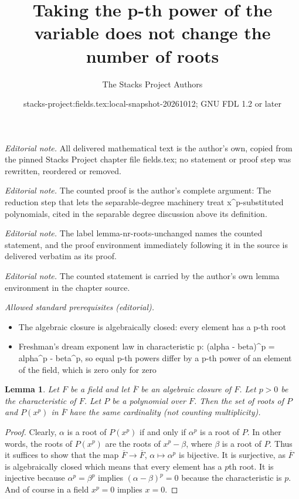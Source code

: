 \documentclass[10pt,a4paper]{amsart}
\title{Taking the p-th power of the variable does not change the number of roots}
\author{The Stacks Project Authors}
\date{stacks-project:fields.tex:local-snapshot-20261012; GNU FDL 1.2 or later}
\theoremstyle{plain}
\newtheorem{lemma}[subsection]{Lemma}
\theoremstyle{definition}
\theoremstyle{remark}
\numberwithin{equation}{subsection}
\begin{document}
\maketitle
\noindent\textit{Editorial note.} All delivered mathematical text is the author's own, copied from the pinned Stacks Project chapter file fields.tex; no statement or proof step was rewritten, reordered or removed.\par\medskip
\noindent\textit{Editorial note.} The counted proof is the author's complete argument: The reduction step that lets the separable-degree machinery treat x\textasciicircum{}p-substituted polynomials, cited in the separable degree discussion above its definition.\par\medskip
\noindent\textit{Editorial note.} The label lemma-nr-roots-unchanged names the counted statement, and the proof environment immediately following it in the source is delivered verbatim as its proof.\par\medskip
\noindent\textit{Editorial note.} The counted statement is carried by the author's own lemma environment in the chapter source.\par\medskip
\noindent\textit{Allowed standard prerequisites (editorial).}\begin{itemize}
\item The algebraic closure is algebraically closed: every element has a p-th root
\item Freshman's dream exponent law in characteristic p: (alpha - beta)\textasciicircum{}p = alpha\textasciicircum{}p - beta\textasciicircum{}p, so equal p-th powers differ by a p-th power of an element of the field, which is zero only for zero
\end{itemize}\medskip
\begin{lemma}
\label{lemma-nr-roots-unchanged}
Let $F$ be a field and let $\overline{F}$ be an algebraic closure of $F$.
Let $p > 0$ be the characteristic of $F$. Let $P$ be a polynomial
over $F$. Then the set of roots of $P$ and $P(x^p)$ in $\overline{F}$
have the same cardinality (not counting multiplicity).
\end{lemma}

\begin{proof}
Clearly, $\alpha$ is a root of $P(x^p)$ if and only if $\alpha^p$ is a
root of $P$. In other words, the roots of $P(x^p)$ are the roots of
$x^p - \beta$, where $\beta$ is a root of $P$. Thus it suffices to show
that the map $\overline{F} \to \overline{F}$, $\alpha \mapsto \alpha^p$
is bijective. It is surjective, as $\overline{F}$ is algebraically closed
which means that every element has a $p$th root. It is injective because
$\alpha^p = \beta^p$ implies $(\alpha - \beta)^p = 0$ because
the characteristic is $p$. And of course in a field $x^p = 0$ implies
$x = 0$.
\end{proof}
\end{document}
